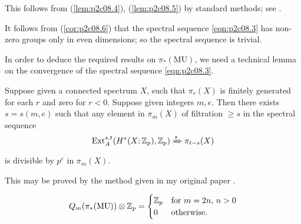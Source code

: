 \documentclass[../main]{subfiles}
\begin{document}
This follows from (\ref{lem:p2c08.4}), (\ref{lem:p2c08.5}) by standard methods; see \cite{milnor2}.

It follows from (\ref{cor:p2c08.6}) that the spectral sequence \eqref{eqn:p2c08.3} has non-zero groups only in even dimensions; so the spectral sequence is trivial.

In order to deduce the required results on $\pi_\ast(\mathrm{MU})$, we need a technical lemma on the convergence of the spectral sequence \eqref{eqn:p2c08.3}.

\begin{lemma}
\label{lem:p2c08.7}
Suppose given a connected spectrum $X$, such that $\pi_r(X)$ is finitely generated for each $r$ and zero for $r < 0$. Suppose given integers $m, e$. Then there exists $s = s(m, e)$ such that any element in $\pi_m(X)$ of filtration $\ge s$ in the spectral sequence \[\mathrm{Ext}_A^{s, t}(H^\ast(X; \mathbb{Z}_p), \mathbb{Z}_p) \xRightarrow{s} \pi_{t - s}(X)\] is divisible by $p^e$ in $\pi_m(X)$.
\end{lemma}

This may be proved by the method given in my original paper \cite{adams}.

\begin{corollary}
\label{cor:p2c08.8}
\[Q_m(\pi_\ast(\mathrm{MU})) \otimes \mathbb{Z}_p = \begin{cases}\mathbb{Z}_p & \text {for } m = 2n, \, n > 0 \\ 0 & \text{otherwise}.\end{cases}\] 
\end{corollary}
\end{document}
